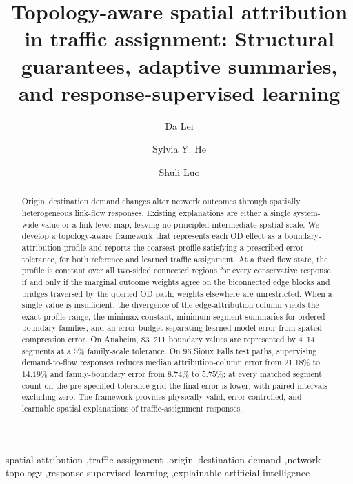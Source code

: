 \documentclass[a4paper,fleqn]{cas-sc}
\begin{document}
\title[mode=title]{Topology-aware spatial attribution in traffic assignment: Structural guarantees, adaptive summaries, and response-supervised learning}
\author[1]{Da Lei}
\author[2]{Sylvia Y. He}
\cormark[1]
\author[3]{Shuli Luo}
\begin{abstract}
Origin--destination demand changes alter network outcomes through spatially heterogeneous link-flow responses. Existing explanations are either a single system-wide value or a link-level map, leaving no principled intermediate spatial scale. We develop a topology-aware framework that represents each OD effect as a boundary-attribution profile and reports the coarsest profile satisfying a prescribed error tolerance, for both reference and learned traffic assignment. At a fixed flow state, the profile is constant over all two-sided connected regions for every conservative response if and only if the marginal outcome weights agree on the biconnected edge blocks and bridges traversed by the queried OD path; weights elsewhere are unrestricted. When a single value is insufficient, the divergence of the edge-attribution column yields the exact profile range, the minimax constant, minimum-segment summaries for ordered boundary families, and an error budget separating learned-model error from spatial compression error. On Anaheim, 83--211 boundary values are represented by 4--14 segments at a $5\%$ family-scale tolerance. On 96 Sioux Falls test paths, supervising demand-to-flow responses reduces median attribution-column error from $21.18\%$ to $14.19\%$ and family-boundary error from $8.74\%$ to $5.75\%$; at every matched segment count on the pre-specified tolerance grid the final error is lower, with paired intervals excluding zero. The framework provides physically valid, error-controlled, and learnable spatial explanations of traffic-assignment responses.
\end{abstract}
\begin{keywords}
spatial attribution \sep traffic assignment \sep origin--destination demand \sep network topology \sep response-supervised learning \sep explainable artificial intelligence
\end{keywords}
\maketitle
{}
\end{document}
